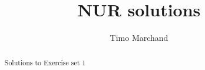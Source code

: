 \documentclass[a4paper,10pt]{article}
\title{NUR solutions}
\author{Timo Marchand}
\begin{document}
\maketitle

\begin{abstract}
Solutions to Exercise set 1
\end{abstract}




\end{document}
